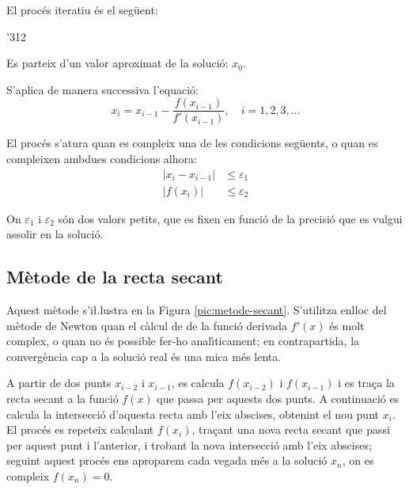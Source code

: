 El proc\'{e}s iteratiu \'{e}s el seg\"{u}ent:

\begin{dingautolist}{'312}
    \item Es parteix d'un valor aproximat de la soluci\'{o}: $x_0$.

    \item   S'aplica de manera successiva l'equaci\'{o}:
            \begin{equation}\label{eq:newton}
              x_i = x_{i-1} - \frac{f(x_{i-1})}{f'(x_{i-1})}, \quad i=1,2,3,\dots
            \end{equation}

    \item   El proc\'{e}s s'atura quan es compleix una de les condicions seg\"{u}ents, o quan es compleixen ambdues condicions alhora:
            \begin{subequations}\begin{align}
              |x_i - x_{i-1}| &\leq \varepsilon_1 \\
              |f(x_i)| &\leq \varepsilon_2
            \end{align}\end{subequations}

            On $\varepsilon_1$ i $\varepsilon_2$ s\'{o}n dos valors petits, que es fixen en funci\'{o} de la precisi\'{o} que es vulgui assolir en la soluci\'{o}.
\end{dingautolist}



\subsection{M\`{e}tode de la recta secant}

Aquest m\`{e}tode s'i{\l.l}ustra en la Figura \vref{pic:metode-secant}. S'utilitza enlloc del m\`{e}tode de Newton quan el c\`{a}lcul de de la funci\'{o} derivada $f'(x)$ \'{e}s molt complex, o quan no \'{e}s possible fer-ho anal\'{\i}ticament; en contrapartida, la converg\`{e}ncia cap a la soluci\'{o} real \'{e}s una
mica m\'{e}s lenta.


\begin{center}
    
    \label{pic:metode-secant}
\end{center}


A partir de dos punts $x_{i-2}$ i $x_{i-1}$, es calcula $f(x_{i-2})$ i $f(x_{i-1})$ i es tra\c{c}a la recta secant a la funci\'{o} $f(x)$ que passa per aquests dos punts. A continuaci\'{o} es calcula la intersecci\'{o} d'aquesta recta amb l'eix abscises, obtenint el nou punt $x_i$. El proc\'{e}s es repeteix calculant $f(x_i)$, tra\c{c}ant una nova recta secant que passi per aquest punt i l'anterior, i trobant la nova intersecci\'{o} amb l'eix abscises; seguint aquest proc\'{e}s ens aproparem cada vegada m\'{e}s a la soluci\'{o} $x_n$, on es compleix $f(x_n)=0$.

